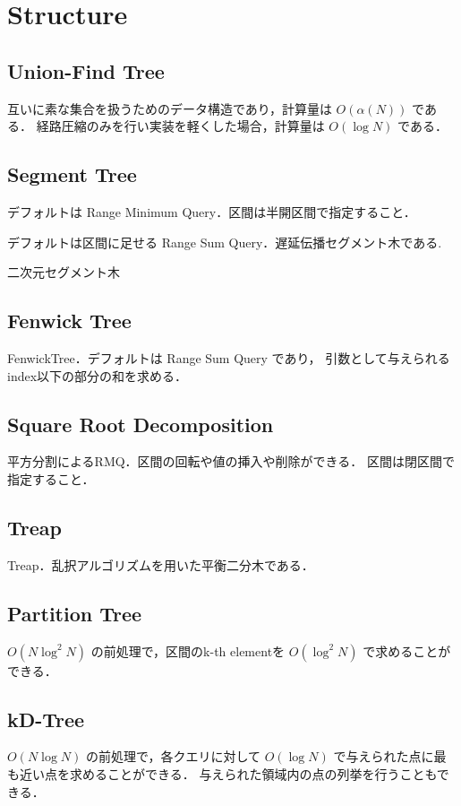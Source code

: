 \section{Structure}

\subsection{Union-Find Tree}
互いに素な集合を扱うためのデータ構造であり，計算量は $O(\alpha(N))$ である．
経路圧縮のみを行い実装を軽くした場合，計算量は $O(\log N)$ である．


\subsection{Segment Tree}
デフォルトは Range Minimum Query．区間は半開区間で指定すること．

デフォルトは区間に足せる Range Sum Query．遅延伝播セグメント木である.

二次元セグメント木


\subsection{Fenwick Tree}
FenwickTree．デフォルトは Range Sum Query であり，
引数として与えられるindex以下の部分の和を求める．


\subsection{Square Root Decomposition}
平方分割によるRMQ．区間の回転や値の挿入や削除ができる．
区間は閉区間で指定すること．


\subsection{Treap}
Treap．乱択アルゴリズムを用いた平衡二分木である．


\subsection{Partition Tree}
$O(N \log^2 N)$ の前処理で，区間のk-th elementを $O(\log^2 N)$ で求めることができる．


\subsection{kD-Tree}
$O(N \log N)$ の前処理で，各クエリに対して $O(\log N)$ で与えられた点に最も近い点を求めることができる．
与えられた領域内の点の列挙を行うこともできる．

